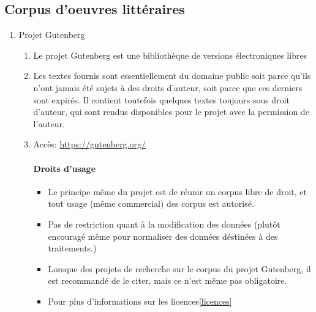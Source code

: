 \documentclass{book}
\newenvironment{titlemize}[1]{%
  \paragraph{#1}
  \begin{itemize}}
  {\end{itemize}}
\begin{document}
\subsection{Corpus d'oeuvres littéraires}%
\begin{enumerate}
	\item Projet Gutenberg
        \begin{enumerate}
            \item Le projet Gutenberg est une bibliothèque de versions électroniques libres
            \item Les textes fournis sont essentiellement du domaine public soit parce qu'ils n'ont jamais été sujets à des droits d'auteur, soit parce que ces derniers sont expirés. Il contient toutefois quelques textes toujours sous droit d'auteur, qui sont rendus disponibles pour le projet avec la permission de l'auteur.
            \item Accès: \url{https://gutenberg.org/}
            
             \begin{titlemize}{Droits d'usage}
                \item Le principe même du projet est de réunir un corpus libre de droit, et tout usage (même commercial) des corpus est autorisé. 
                \item Pas de restriction quant à la modification des données (plutôt encouragé même pour normaliser des données déstinées à des traitements.)
                \item Lorsque des projets de recherche sur le corpus du projet Gutenberg, il est recommandé de le citer, mais ce n'est même pas obligatoire.
                \item Pour plus d'informations sur les licences\ref{licences}
	      	\end{titlemize}
        
        \end{enumerate}
        

\end{enumerate}
\end{document}

